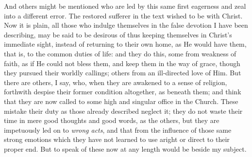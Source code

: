 And others might be mentioned who are led by this same
first eagerness and zeal into a different error. The
restored sufferer in the text wished to be with Christ.
Now it is plain, all those who indulge themselves in the
false devotion I have been describing, may be said to be desirous of thus keeping themselves in Christ's immediate
sight, instead of returning to their own home, as He
would have them, that is, to the common duties of life:
and they do this, some from weakness of faith, as if He
could not bless them, and keep them in the way of grace,
though they pursued their worldly callings; others from
an ill-directed love of Him. But there are others, I say,
who, when they are awakened to a sense of religion,
forthwith despise their former condition altogether, as
beneath them; and think that they are now called to some
high and singular office in the Church. These mistake
their duty as those already described neglect it; they do
not waste their time in mere good thoughts and good
words, as the others, but they are impetuously led on to \emph{wrong
acts}, and that from the influence of those same
strong emotions which they have not learned to use aright
or direct to their proper end. But to speak of these now
at any length would be beside my subject.

